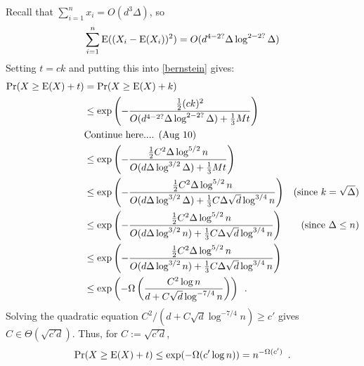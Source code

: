 \documentclass{patmorin}
\begin{document}
Recall that $\sum_{i=1}^n x_i = O(d^3\Delta)$, so
\[
  \sum_{i=1}^n\mathrm{E}((X_i-\mathrm{E}(X_i))^2) = O(d^{4-2?}\Delta\log^{2-2?} \Delta)
\]
Setting $t=ck$ and putting this into \cref{bernstein} gives:
\begin{align*}
  \Pr(X\ge \mathrm{E}(X)+t)
  & = \Pr(X\ge \mathrm{E}(X)+k) \\
  & \le \exp \left(-\frac{\tfrac{1}{2}(ck)^2}{O(d^{4-2?}\Delta\log^{2-2?}\Delta) + \tfrac{1}{3}Mt}\right) \\
  & \text{Continue here.... (Aug 10)} \\
  & \le \exp \left(-\frac{\tfrac{1}{2}C^2\Delta\log^{5/2} n}{O(d\Delta\log^{3/2}\Delta) + \tfrac{1}{3}Mt}\right) \\
  & \le \exp \left(-\frac{\tfrac{1}{2}C^2\Delta\log^{5/2} n}{O(d\Delta\log^{3/2}\Delta) + \tfrac{1}{3}C\Delta\sqrt{d}\log^{3/4} n}\right) & \text{(since $k=\sqrt{\Delta}$)} \\
  & \le \exp \left(-\frac{\tfrac{1}{2}C^2\Delta\log^{5/2} n}{O(d\Delta\log^{3/2} n) + \tfrac{1}{3}C\Delta\sqrt{d}\log^{3/4} n}\right)
  & \text{(since $\Delta \le n$)} \\
  & \le \exp \left(-\frac{\tfrac{1}{2}C^2\Delta\log^{5/2} n}{O(d\Delta\log^{3/2} n) + \tfrac{1}{3}C\Delta\sqrt{d}\log^{3/4} n}\right) \\
  & \le \exp \left(-\Omega\left(\frac{C^2\log n}{d + C\sqrt{d}\log^{-7/4} n}\right)\right) \enspace .
\end{align*}
Solving the quadratic equation $C^2/(d+C\sqrt{d}\log^{-7/4} n) \ge c'$ gives $C\in\Theta(\sqrt{c'd})$. Thus, for $C:=\sqrt{c'd}$,
\[
  \Pr(X\ge \mathrm{E}(X)+t) \le \exp(-\Omega(c'\log n)) = n^{-\Omega(c')} \enspace .
\]
\end{document}

